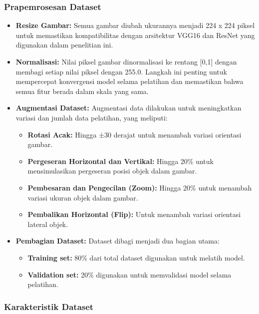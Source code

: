 \documentclass[12pt,a4paper]{article}
\begin{document}
\subsubsection{Prapemrosesan Dataset}

\begin{itemize}
    \item \textbf{Resize Gambar:} Semua gambar diubah ukurannya menjadi 224 x 224 piksel untuk memastikan kompatibilitas dengan arsitektur VGG16 dan ResNet yang digunakan dalam penelitian ini.

    \item \textbf{Normalisasi:} Nilai piksel gambar dinormalisasi ke rentang [0,1] dengan membagi setiap nilai piksel dengan 255.0. Langkah ini penting untuk mempercepat konvergensi model selama pelatihan dan memastikan bahwa semua fitur berada dalam skala yang sama.

    \item \textbf{Augmentasi Dataset:} Augmentasi data dilakukan untuk meningkatkan variasi dan jumlah data pelatihan, yang meliputi:
    \begin{itemize}
        \item \textbf{Rotasi Acak:} Hingga ±30 derajat untuk menambah variasi orientasi gambar.
        \item \textbf{Pergeseran Horizontal dan Vertikal:} Hingga 20\% untuk mensimulasikan pergeseran posisi objek dalam gambar.
        \item \textbf{Pembesaran dan Pengecilan (Zoom):} Hingga 20\% untuk menambah variasi ukuran objek dalam gambar.
        \item \textbf{Pembalikan Horizontal (Flip):} Untuk menambah variasi orientasi lateral objek.
    \end{itemize}

    \item \textbf{Pembagian Dataset:} Dataset dibagi menjadi dua bagian utama:
    \begin{itemize}
        \item \textbf{Training set:} 80\% dari total dataset digunakan untuk melatih model.
        \item \textbf{Validation set:} 20\% digunakan untuk memvalidasi model selama pelatihan.
    \end{itemize}
\end{itemize}

\subsubsection{Karakteristik Dataset}
\end{document}
